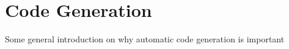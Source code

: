 \chapter{Code Generation}\label{ch:CodeGeneration}
Some general introduction on why automatic code generation is important


